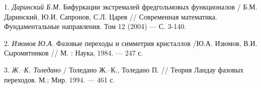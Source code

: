 \litlist

1.  {\it Даринский Б.М.} Бифуркации экстремалей фредгольмовых функционалов
/ Б.М. Даринский, Ю.И. Сапронов, С.Л. Царев  // Современная
математика. Фундаментальные направления. Том 12 (2004) --- С. 3-140.

2. {\it Изюмов Ю.А.} Фазовые переходы и симметрия кристаллов /Ю.А. Изюмов,
В.И. Сыромятников // М. : Наука, 1984. --- 247 с.

3. {\it Ж.--К. Толедано}  /  Толедано Ж.--К., Толедано П.  // Теория
Ландау фазовых переходов. М.: Мир. 1994. --- 461 с.
